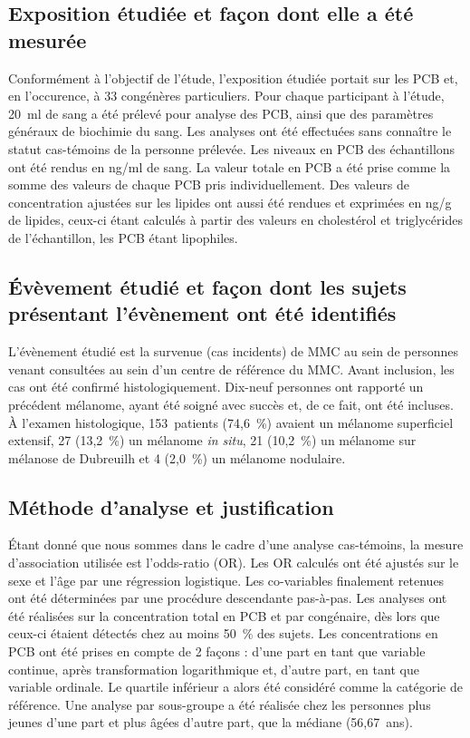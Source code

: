 \documentclass[10pt]{article}
\begin{document}
\subsection{Exposition étudiée et façon dont elle a été mesurée}
Conformément à l'objectif de l'étude, l'exposition étudiée portait sur les PCB et, en l'occurence, à 33 congénères particuliers. Pour chaque participant à l'étude, 20~ml de sang a été prélevé pour analyse des PCB, ainsi que des paramètres généraux de biochimie du sang. Les analyses ont été effectuées sans connaître le statut cas-témoins de la personne prélevée. Les niveaux en PCB des échantillons ont été rendus en ng/ml de sang. La valeur totale en PCB a été prise comme la somme des valeurs de chaque PCB pris individuellement. Des valeurs de concentration ajustées sur les lipides ont aussi été rendues et exprimées en ng/g de lipides, ceux-ci étant calculés à partir des valeurs en cholestérol et triglycérides de l'échantillon, les PCB étant lipophiles.

\subsection{\'{E}vèvement étudié et façon dont les sujets présentant l'évènement ont été identifiés}
L'évènement étudié est la survenue (cas incidents) de MMC au sein de personnes venant consultées au sein d'un centre de référence du MMC. Avant inclusion, les cas ont été confirmé histologiquement. Dix-neuf personnes ont rapporté un précédent mélanome, ayant été soigné avec succès et, de ce fait, ont été incluses. \`{A} l'examen histologique, 153~patients (74,6~\%) avaient un mélanome superficiel extensif, 27 (13,2~\%) un mélanome \emph{in situ}, 21 (10,2~\%) un mélanome sur mélanose de Dubreuilh et 4 (2,0~\%) un mélanome nodulaire.  

\subsection{Méthode d'analyse et justification}
\'{E}tant donné que nous sommes dans le cadre d'une analyse cas-témoins, la mesure d'association utilisée est l'odds-ratio (OR). Les OR calculés ont été ajustés sur le sexe et l'âge par une régression logistique. Les co-variables finalement retenues ont été déterminées par une procédure descendante pas-à-pas. Les analyses ont été réalisées sur la concentration total en PCB et par congénaire, dès lors que ceux-ci étaient détectés chez au moins 50~\% des sujets. Les concentrations en PCB ont été prises en compte de 2 façons : d'une part en tant que variable continue, après transformation logarithmique et, d'autre part, en tant que variable ordinale. Le quartile inférieur a alors été considéré comme la catégorie de référence. Une analyse par sous-groupe a été réalisée chez les personnes plus jeunes d'une part et plus âgées d'autre part, que la médiane (56,67~ans). 
\end{document}
